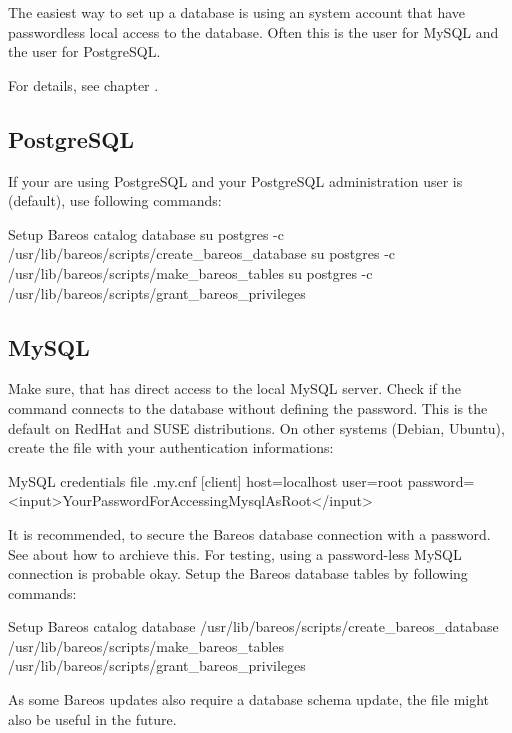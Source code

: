 The easiest way to set up a database is using an system account that have passwordless local access to the database. 
Often this is the user  for MySQL and the user  for PostgreSQL.

For details, see chapter .

\subsection{PostgreSQL}
If your are using PostgreSQL and your PostgreSQL administration user is  (default), use following commands:

\begin{commands}{Setup Bareos catalog database}
su postgres -c /usr/lib/bareos/scripts/create_bareos_database
su postgres -c /usr/lib/bareos/scripts/make_bareos_tables
su postgres -c /usr/lib/bareos/scripts/grant_bareos_privileges
\end{commands}


\subsection{MySQL}
Make sure, that  has direct access to the local MySQL server. 
Check if the command  connects to the database without defining the password.
This is the default on RedHat and SUSE distributions. 
On other systems (Debian, Ubuntu),
create the file  with your authentication informations:

\begin{config}{MySQL credentials file .my.cnf}
[client]
host=localhost
user=root
password=<input>YourPasswordForAccessingMysqlAsRoot</input>
\end{config}

It is recommended, to secure the Bareos database connection with a password.
See  about how to archieve this.
For testing, using a password-less MySQL connection is probable okay.
Setup the Bareos database tables by following commands:
\begin{commands}{Setup Bareos catalog database}
/usr/lib/bareos/scripts/create_bareos_database
/usr/lib/bareos/scripts/make_bareos_tables
/usr/lib/bareos/scripts/grant_bareos_privileges
\end{commands}

As some Bareos updates also require a database schema update,
the file  might also be useful in the future.


